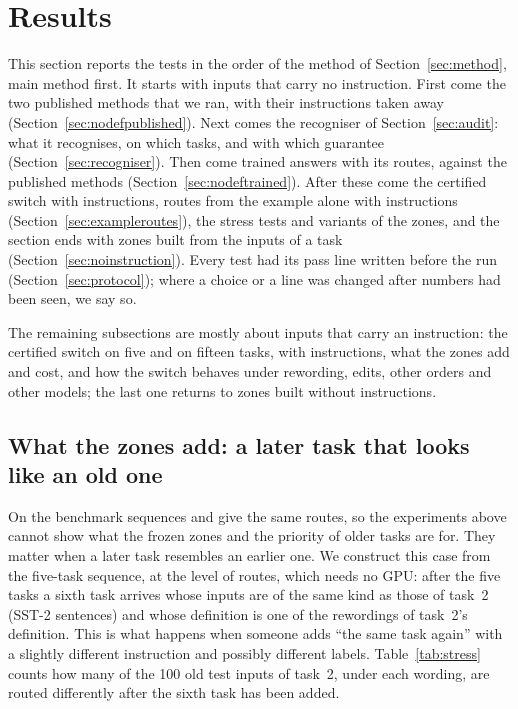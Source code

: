 \section{Results}
\label{sec:results}

This section reports the tests in the order of the method of Section~\ref{sec:method}, main method first. It starts with inputs that carry no instruction. First come the two published methods that we ran, with their instructions taken away (Section~\ref{sec:nodefpublished}). Next comes the recogniser \recog{} of Section~\ref{sec:audit}: what it recognises, on which tasks, and with which guarantee (Section~\ref{sec:recogniser}). Then come trained answers with its routes, against the published methods (Section~\ref{sec:nodeftrained}). After these come the certified switch \cert{} with instructions, routes from the example alone with instructions (Section~\ref{sec:exampleroutes}), the stress tests and variants of the zones, and the section ends with zones built from the inputs of a task (Section~\ref{sec:noinstruction}). Every test had its pass line written before the run (Section~\ref{sec:protocol}); where a choice or a line was changed after numbers had been seen, we say so.







The remaining subsections are mostly about inputs that carry an instruction: the certified switch \cert{} on five and on fifteen tasks, \recog{} with instructions, what the zones add and cost, and how the switch behaves under rewording, edits, other orders and other models; the last one returns to zones built without instructions.







\subsection{What the zones add: a later task that looks like an old one}
\label{sec:stress}

On the benchmark sequences \nearest{} and \cert{} give the same routes, so the experiments above
cannot show what the frozen zones and the priority of older tasks are for. They matter when a later
task resembles an earlier one. We construct this case from the five-task sequence, at the level of
routes, which needs no GPU: after the five tasks a sixth task arrives whose inputs are of the same
kind as those of task~2 (SST-2 sentences) and whose definition is one of the rewordings of task~2's
definition. This is what happens when someone adds ``the same task again'' with a slightly
different instruction and possibly different labels. Table~\ref{tab:stress} counts how many of the
100 old test inputs of task~2, under each wording, are routed differently after the sixth task has
been added.

